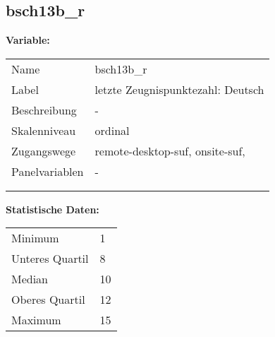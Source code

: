 	
	
	\subsection{bsch13b\_r}
	\label{subSection:bsch13b_r}

	\noindent\textbf{Variable:}\\
		\begin{tabular}{lL{11.3cm}}
			\label{tableVariable:bsch13b_r}
			Name & bsch13b\_r \\
			Label & letzte Zeugnispunktezahl: Deutsch \\
			Beschreibung & - \\
			Skalenniveau & ordinal \\
			Zugangswege &
				remote-desktop-suf,
				onsite-suf,
 \\
			Panelvariablen & -
			 \\
			 \\
 \\
		\end{tabular}



		\vspace*{1 cm}
		\noindent\textbf{Statistische Daten:}\\
			\begin{tabular}{ll}
				\label{tableStatistics:bsch13b_r}
					Minimum & 1 \\
					Unteres Quartil & 8 \\
					Median & 10 \\
					Oberes Quartil & 12 \\
					Maximum & 15 \\
			\end{tabular}



